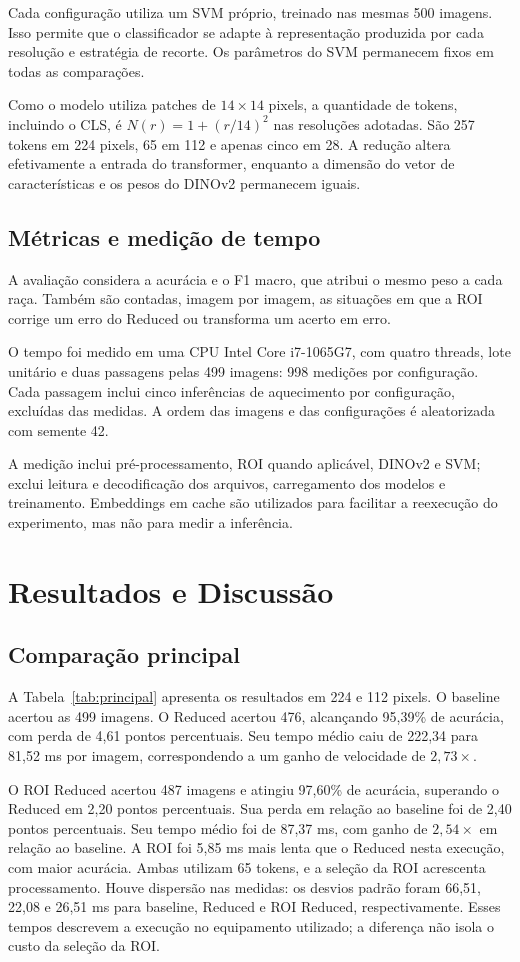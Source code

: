 \documentclass[conference]{IEEEtran}
\begin{document}
Cada configuração utiliza um SVM próprio, treinado nas mesmas 500
imagens. Isso permite que o classificador se adapte à representação
produzida por cada resolução e estratégia de recorte. Os parâmetros
do SVM permanecem fixos em todas as comparações.

Como o modelo utiliza patches de $14\times14$ pixels, a quantidade
de tokens, incluindo o CLS, é $N(r)=1+(r/14)^2$ nas resoluções adotadas.
São 257 tokens em 224 pixels, 65 em 112 e apenas cinco em 28.
A redução altera efetivamente a entrada do transformer, enquanto a
dimensão do vetor de características e os pesos do DINOv2 permanecem iguais.

\subsection{Métricas e medição de tempo}
A avaliação considera a acurácia e o F1 macro, que atribui o mesmo
peso a cada raça. Também são contadas, imagem por imagem, as situações
em que a ROI corrige um erro do Reduced ou transforma um acerto em erro.

O tempo foi medido em uma CPU Intel Core i7-1065G7, com quatro threads,
lote unitário e duas passagens pelas 499 imagens: 998 medições por
configuração. Cada passagem inclui cinco inferências de aquecimento
por configuração, excluídas das medidas. A ordem das imagens e das
configurações é aleatorizada com semente 42.

A medição inclui pré-processamento, ROI quando aplicável, DINOv2 e SVM;
exclui leitura e decodificação dos arquivos, carregamento dos modelos
e treinamento. Embeddings em cache são utilizados para facilitar a
reexecução do experimento, mas não para medir a inferência.

\section{Resultados e Discussão}
\subsection{Comparação principal}
A Tabela~\ref{tab:principal} apresenta os resultados em 224 e 112 pixels.
O baseline acertou as 499 imagens. O Reduced acertou 476, alcançando
95,39\% de acurácia, com perda de 4,61 pontos percentuais.
Seu tempo médio caiu de 222,34 para 81,52 ms por imagem, correspondendo
a um ganho de velocidade de $2{,}73\times$.

O ROI Reduced acertou 487 imagens e atingiu 97,60\% de acurácia,
superando o Reduced em 2,20 pontos percentuais. Sua perda em relação
ao baseline foi de 2,40 pontos percentuais.
Seu tempo médio foi de 87,37 ms, com ganho de $2{,}54\times$ em relação
ao baseline. A ROI foi 5,85 ms mais lenta que o Reduced nesta execução,
com maior acurácia. Ambas utilizam 65 tokens, e a seleção da ROI
acrescenta processamento. Houve dispersão nas medidas: os desvios
padrão foram 66,51, 22,08 e 26,51 ms para baseline, Reduced e ROI Reduced,
respectivamente. Esses tempos descrevem a execução no equipamento
utilizado; a diferença não isola o custo da seleção da ROI.
\end{document}
